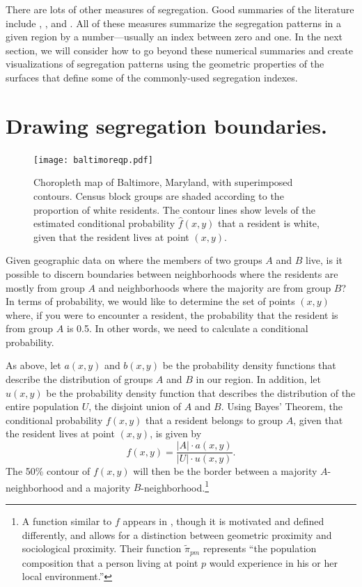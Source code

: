 \documentclass{article}
\theoremstyle{theorem}
\theoremstyle{definition}
\begin{document}
There are lots of other measures of segregation. Good summaries of the literature include \cite{reardonosullivan04}, \cite{harrisjohnson18}, and \cite{yao18}. All of these measures summarize the segregation patterns in a given region by a number---usually an index between zero and one. In the next section, we will consider how to go beyond these numerical summaries and create visualizations of segregation patterns using the geometric properties of the surfaces that define some of the commonly-used segregation indexes.

\section{Drawing segregation boundaries.}

\begin{figure}[t!]\centering
  \texttt{[image: baltimoreqp.pdf]}
  \caption{Choropleth map of Baltimore, Maryland, with superimposed contours. Census block groups are shaded according to the proportion of white residents. The contour lines show levels of the estimated conditional probability $\hat{f}(x,y)$ that a resident is white, given that the resident lives at point $(x,y)$.}
  \label{fig:choropleth}
\end{figure}

Given geographic data on where the members of two groups $A$ and $B$ live, is it possible to discern boundaries between neighborhoods where the residents are mostly from group $A$ and neighborhoods where the majority are from group $B$? In terms of probability, we would like to determine the set of points $(x,y)$ where, if you were to encounter a resident, the probability that the resident is from group $A$ is 0.5. In other words, we need to calculate a conditional probability.

As above, let $a(x,y)$ and $b(x,y)$ be the probability density functions that describe the distribution of groups $A$ and $B$ in our region. In addition, let $u(x,y)$ be the probability density function that describes the distribution of the entire population $U$, the disjoint union of $A$ and $B$. Using Bayes' Theorem, the conditional probability $f(x,y)$ that a resident belongs to group $A$, given that the resident lives at point $(x,y)$, is given by
\begin{equation}\label{eqn:f}
  f(x,y) = \frac{\lvert A\rvert\cdot a(x,y)}{\lvert U\rvert \cdot u(x,y)}\text{.}
\end{equation}
The 50\% contour of $f(x,y)$ will then be the border between a majority $A$-neighborhood and a majority $B$-neighborhood.\footnote{A function similar to $f$ appears in \cite{reardonosullivan04}, though it is motivated and defined differently, and allows for a distinction between geometric proximity and sociological proximity. Their function $\tilde{\pi}_{pm}$ represents ``the population composition that a person living at point $p$ would experience in his or her local environment.''}
\end{document}
